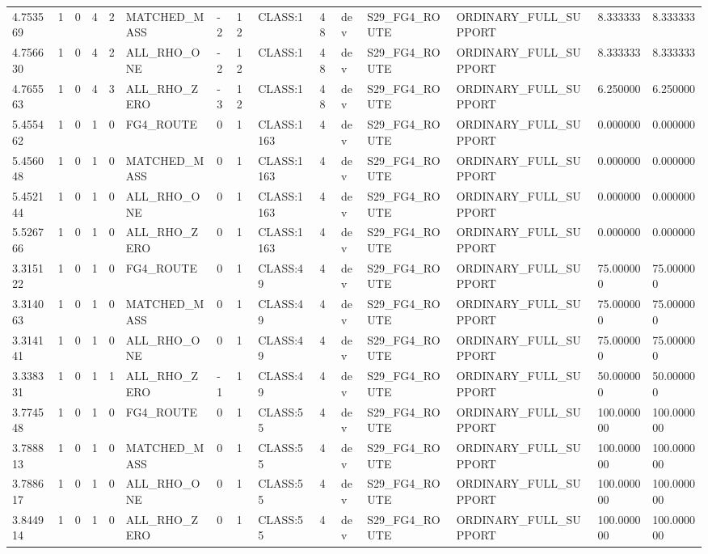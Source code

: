 \begin{tabular}{lllllllllllllll}
4.753569 & 1 & 0 & 4 & 2 & MATCHED\_MASS & -2 & 12 & CLASS:1 & 48 & dev & S29\_FG4\_ROUTE & ORDINARY\_FULL\_SUPPORT & 8.333333 & 8.333333 \\
4.756630 & 1 & 0 & 4 & 2 & ALL\_RHO\_ONE & -2 & 12 & CLASS:1 & 48 & dev & S29\_FG4\_ROUTE & ORDINARY\_FULL\_SUPPORT & 8.333333 & 8.333333 \\
4.765563 & 1 & 0 & 4 & 3 & ALL\_RHO\_ZERO & -3 & 12 & CLASS:1 & 48 & dev & S29\_FG4\_ROUTE & ORDINARY\_FULL\_SUPPORT & 6.250000 & 6.250000 \\
5.455462 & 1 & 0 & 1 & 0 & FG4\_ROUTE & 0 & 1 & CLASS:1163 & 4 & dev & S29\_FG4\_ROUTE & ORDINARY\_FULL\_SUPPORT & 0.000000 & 0.000000 \\
5.456048 & 1 & 0 & 1 & 0 & MATCHED\_MASS & 0 & 1 & CLASS:1163 & 4 & dev & S29\_FG4\_ROUTE & ORDINARY\_FULL\_SUPPORT & 0.000000 & 0.000000 \\
5.452144 & 1 & 0 & 1 & 0 & ALL\_RHO\_ONE & 0 & 1 & CLASS:1163 & 4 & dev & S29\_FG4\_ROUTE & ORDINARY\_FULL\_SUPPORT & 0.000000 & 0.000000 \\
5.526766 & 1 & 0 & 1 & 0 & ALL\_RHO\_ZERO & 0 & 1 & CLASS:1163 & 4 & dev & S29\_FG4\_ROUTE & ORDINARY\_FULL\_SUPPORT & 0.000000 & 0.000000 \\
3.315122 & 1 & 0 & 1 & 0 & FG4\_ROUTE & 0 & 1 & CLASS:49 & 4 & dev & S29\_FG4\_ROUTE & ORDINARY\_FULL\_SUPPORT & 75.000000 & 75.000000 \\
3.314063 & 1 & 0 & 1 & 0 & MATCHED\_MASS & 0 & 1 & CLASS:49 & 4 & dev & S29\_FG4\_ROUTE & ORDINARY\_FULL\_SUPPORT & 75.000000 & 75.000000 \\
3.314141 & 1 & 0 & 1 & 0 & ALL\_RHO\_ONE & 0 & 1 & CLASS:49 & 4 & dev & S29\_FG4\_ROUTE & ORDINARY\_FULL\_SUPPORT & 75.000000 & 75.000000 \\
3.338331 & 1 & 0 & 1 & 1 & ALL\_RHO\_ZERO & -1 & 1 & CLASS:49 & 4 & dev & S29\_FG4\_ROUTE & ORDINARY\_FULL\_SUPPORT & 50.000000 & 50.000000 \\
3.774548 & 1 & 0 & 1 & 0 & FG4\_ROUTE & 0 & 1 & CLASS:55 & 4 & dev & S29\_FG4\_ROUTE & ORDINARY\_FULL\_SUPPORT & 100.000000 & 100.000000 \\
3.788813 & 1 & 0 & 1 & 0 & MATCHED\_MASS & 0 & 1 & CLASS:55 & 4 & dev & S29\_FG4\_ROUTE & ORDINARY\_FULL\_SUPPORT & 100.000000 & 100.000000 \\
3.788617 & 1 & 0 & 1 & 0 & ALL\_RHO\_ONE & 0 & 1 & CLASS:55 & 4 & dev & S29\_FG4\_ROUTE & ORDINARY\_FULL\_SUPPORT & 100.000000 & 100.000000 \\
3.844914 & 1 & 0 & 1 & 0 & ALL\_RHO\_ZERO & 0 & 1 & CLASS:55 & 4 & dev & S29\_FG4\_ROUTE & ORDINARY\_FULL\_SUPPORT & 100.000000 & 100.000000 \\

\end{tabular}

